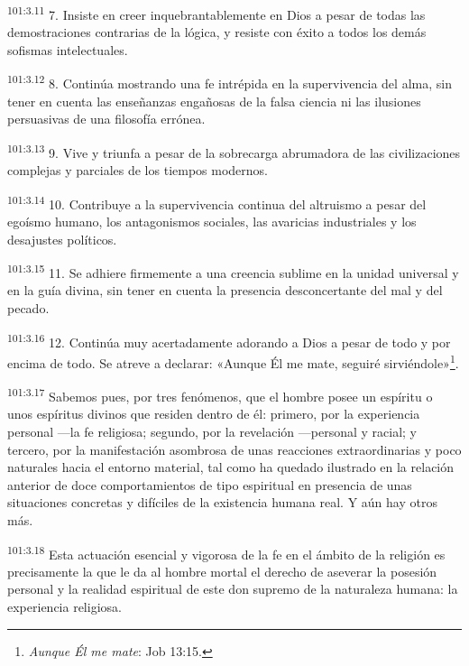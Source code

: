 \par
\textsuperscript{101:3.11} 7. Insiste en creer inquebrantablemente en Dios a pesar de todas las demostraciones contrarias de la lógica, y resiste con éxito a todos los demás sofismas intelectuales.

\par
\textsuperscript{101:3.12} 8. Continúa mostrando una fe intrépida en la supervivencia del alma, sin tener en cuenta las enseñanzas engañosas de la falsa ciencia ni las ilusiones persuasivas de una filosofía errónea.

\par
\textsuperscript{101:3.13} 9. Vive y triunfa a pesar de la sobrecarga abrumadora de las civilizaciones complejas y parciales de los tiempos modernos.

\par
\textsuperscript{101:3.14} 10. Contribuye a la supervivencia continua del altruismo a pesar del egoísmo humano, los antagonismos sociales, las avaricias industriales y los desajustes políticos.

\par
\textsuperscript{101:3.15} 11. Se adhiere firmemente a una creencia sublime en la unidad universal y en la guía divina, sin tener en cuenta la presencia desconcertante del mal y del pecado.

\par
\textsuperscript{101:3.16} 12. Continúa muy acertadamente adorando a Dios a pesar de todo y por encima de todo. Se atreve a declarar: «Aunque Él me mate, seguiré sirviéndole»\footnote{\textit{Aunque Él me mate}: Job 13:15.}.

\par
\textsuperscript{101:3.17} Sabemos pues, por tres fenómenos, que el hombre posee un espíritu o unos espíritus divinos que residen dentro de él: primero, por la experiencia personal ---la fe religiosa; segundo, por la revelación ---personal y racial; y tercero, por la manifestación asombrosa de unas reacciones extraordinarias y poco naturales hacia el entorno material, tal como ha quedado ilustrado en la relación anterior de doce comportamientos de tipo espiritual en presencia de unas situaciones concretas y difíciles de la existencia humana real. Y aún hay otros más.

\par
\textsuperscript{101:3.18} Esta actuación esencial y vigorosa de la fe en el ámbito de la religión es precisamente la que le da al hombre mortal el derecho de aseverar la posesión personal y la realidad espiritual de este don supremo de la naturaleza humana: la experiencia religiosa.

